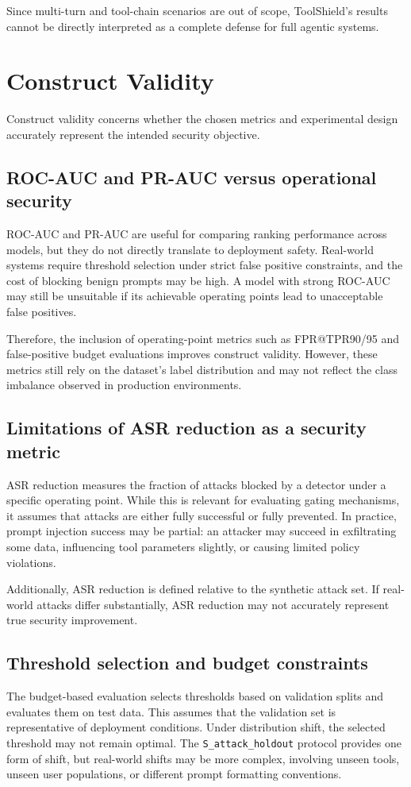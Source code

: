 Since multi-turn and tool-chain scenarios are out of scope, ToolShield's results cannot be directly interpreted as a complete defense for full agentic systems.

\section{Construct Validity}
\label{subsec:construct_validity}

Construct validity concerns whether the chosen metrics and experimental design accurately represent the intended security objective.

\subsection{ROC-AUC and PR-AUC versus operational security}
ROC-AUC and PR-AUC are useful for comparing ranking performance across models, but they do not directly translate to deployment safety. Real-world systems require threshold selection under strict false positive constraints, and the cost of blocking benign prompts may be high. A model with strong ROC-AUC may still be unsuitable if its achievable operating points lead to unacceptable false positives.

Therefore, the inclusion of operating-point metrics such as FPR@TPR90/95 and false-positive budget evaluations improves construct validity. However, these metrics still rely on the dataset's label distribution and may not reflect the class imbalance observed in production environments.

\subsection{Limitations of ASR reduction as a security metric}
ASR reduction measures the fraction of attacks blocked by a detector under a specific operating point. While this is relevant for evaluating gating mechanisms, it assumes that attacks are either fully successful or fully prevented. In practice, prompt injection success may be partial: an attacker may succeed in exfiltrating some data, influencing tool parameters slightly, or causing limited policy violations.

Additionally, ASR reduction is defined relative to the synthetic attack set. If real-world attacks differ substantially, ASR reduction may not accurately represent true security improvement.

\subsection{Threshold selection and budget constraints}
The budget-based evaluation selects thresholds based on validation splits and evaluates them on test data. This assumes that the validation set is representative of deployment conditions. Under distribution shift, the selected threshold may not remain optimal. The \texttt{S\_attack\_holdout} protocol provides one form of shift, but real-world shifts may be more complex, involving unseen tools, unseen user populations, or different prompt formatting conventions.

